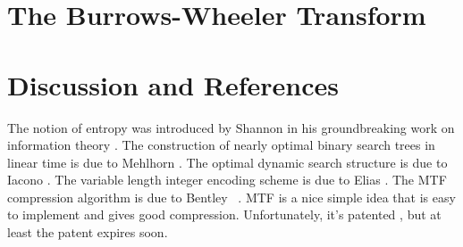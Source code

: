 \section{The Burrows-Wheeler Transform}

\section{Discussion and References}

The notion of entropy was introduced by Shannon in his groundbreaking work
on information theory \cite{s48}.  The construction of nearly optimal
binary search trees in linear time is due to Mehlhorn \cite{m75}.
The optimal dynamic search structure is due to Iacono \cite{i01}.
The variable length integer encoding scheme is due to Elias \cite{e75}.
The MTF compression algorithm is due to Bentley \etal\ \cite{bstw86}.
MTF is a nice simple idea that is easy to implement and gives good
compression.  Unfortunately, it's patented \cite{bst89}, but at least
the patent expires soon.


